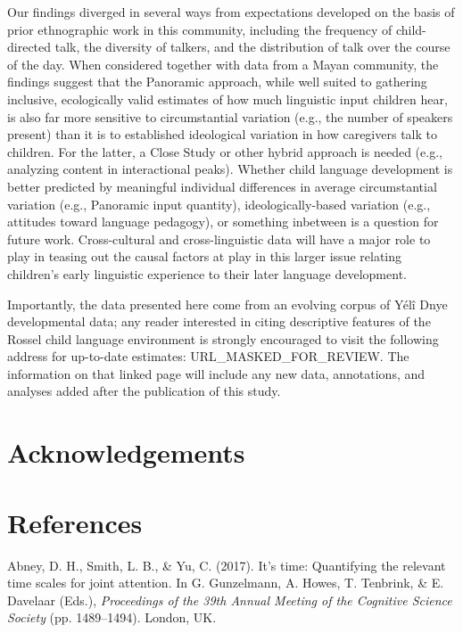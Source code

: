 \documentclass[,man,floatsintext]{apa6}
\begin{document}
Our findings diverged in several ways from expectations developed on the
basis of prior ethnographic work in this community, including the
frequency of child-directed talk, the diversity of talkers, and the
distribution of talk over the course of the day. When considered
together with data from a Mayan community, the findings suggest that the
Panoramic approach, while well suited to gathering inclusive,
ecologically valid estimates of how much linguistic input children hear,
is also far more sensitive to circumstantial variation (e.g., the number
of speakers present) than it is to established ideological variation in
how caregivers talk to children. For the latter, a Close Study or other
hybrid approach is needed (e.g., analyzing content in interactional
peaks). Whether child language development is better predicted by
meaningful individual differences in average circumstantial variation
(e.g., Panoramic input quantity), ideologically-based variation (e.g.,
attitudes toward language pedagogy), or something inbetween is a
question for future work. Cross-cultural and cross-linguistic data will
have a major role to play in teasing out the causal factors at play in
this larger issue relating children's early linguistic experience to
their later language development.

Importantly, the data presented here come from an evolving corpus of
Yélî Dnye developmental data; any reader interested in citing
descriptive features of the Rossel child language environment is
strongly encouraged to visit the following address for up-to-date
estimates: URL\_MASKED\_FOR\_REVIEW. The information on that linked page
will include any new data, annotations, and analyses added after the
publication of this study.

\section{Acknowledgements}\label{acknowledgements}

\newpage

\section{References}\label{refs}

\begingroup
\setlength{\parindent}{-0.5in} \setlength{\leftskip}{0.5in}

\hypertarget{refs}{}
\hypertarget{ref-abney2017time}{}
Abney, D. H., Smith, L. B., \& Yu, C. (2017). It's time: Quantifying the
relevant time scales for joint attention. In G. Gunzelmann, A. Howes, T.
Tenbrink, \& E. Davelaar (Eds.), \emph{Proceedings of the 39th Annual
Meeting of the Cognitive Science Society} (pp. 1489--1494). London, UK.
\end{document}
